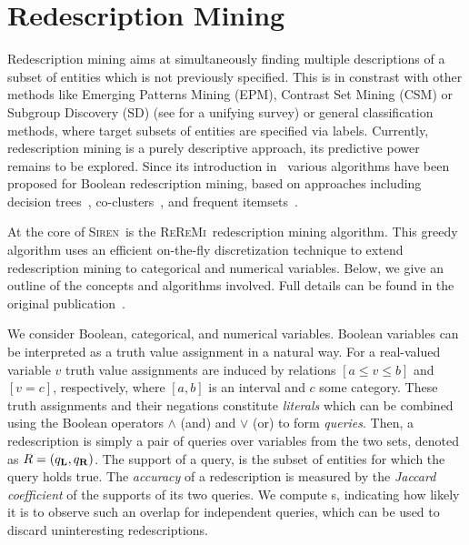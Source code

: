 \documentclass{sig-alternate}
\newcommand{\Siren}{\textsc{Siren}}
\newcommand{\ReReMi}{\textsc{ReReMi}}
\begin{document}
\section{Redescription Mining}
Redescription mining aims at simultaneously finding multiple
descriptions of a subset of entities which is not previously
specified.  This is in constrast with other methods like Emerging
Patterns Mining (EPM), Contrast Set Mining (CSM) or Subgroup Discovery
(SD) (see \cite{kralj09supervised} for a unifying survey) or general
classification methods, where target subsets of entities are specified
via labels.  Currently, redescription mining is a purely descriptive
approach, its predictive power remains to be explored.  Since its
introduction in~\cite{ramakrishnan04turning} various algorithms have
been proposed for Boolean redescription mining, based on approaches
including decision
trees~\cite{ramakrishnan04turning,kumar07redescription},
co-clusters~\cite{parida05redescription}, and frequent
itemsets~\cite{gallo08finding}.

At the core of \Siren\ is the \ReReMi\ redescription mining
algorithm. This greedy algorithm uses an efficient on-the-fly
discretization technique to extend redescription mining to categorical
and numerical variables.  Below, we give an outline of the concepts and
algorithms involved. Full details can be found
in the original publication~\cite{galbrun11black}.

We consider Boolean, categorical, and numerical variables. Boolean
variables can be interpreted as a truth value assignment in a natural
way.  For a real-valued variable $v$ truth value assignments are
induced by relations $[a \leq v \leq b]$ and $[v=c]$, respectively,
where $[a, b]$ is an interval and $c$ some category.  These truth
assignments and their negations constitute \emph{literals} which can
be combined using the Boolean operators $\land$ (and) and $\lor$ (or)
to form \emph{queries}.  Then, a redescription is simply a pair of
queries over variables from the two sets, denoted as
$R=(q_{\mathbf{L}},q_{\mathbf{R}})$.  The support of a query, is the subset of
entities for which the query holds true.  The \emph{accuracy} of a
redescription is measured by the \emph{Jaccard
  coefficient} of the supports of its two queries. We compute \pValue{}s,
indicating how likely it is to observe such an overlap for independent
queries, which can be used to discard uninteresting redescriptions.
\end{document}

